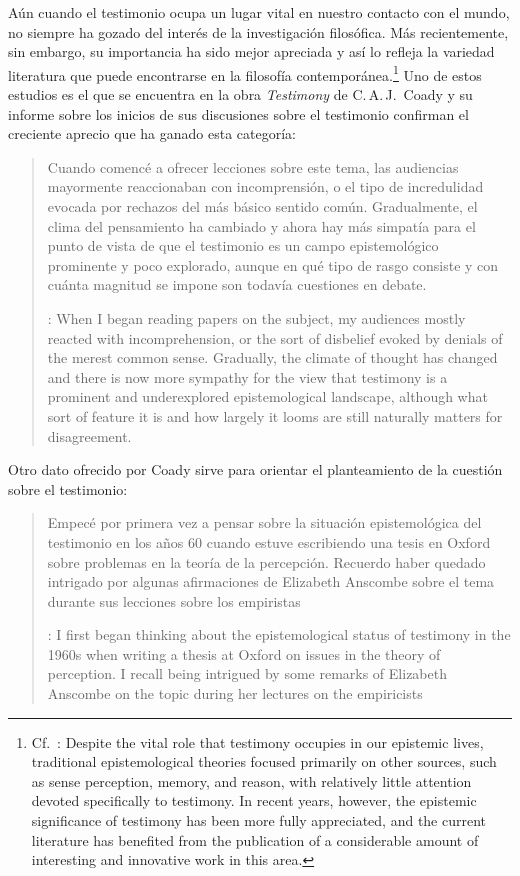 Aún cuando el testimonio ocupa un lugar vital en nuestro contacto con el mundo,
no siempre ha gozado del interés de la investigación filosófica. Más
recientemente, sin embargo, su importancia ha sido mejor apreciada y así lo
refleja la variedad literatura que puede encontrarse en la filosofía
contemporánea.\footnote{Cf.~\cite[1]{lackeysosa2006eptest}: Despite the vital
  role that testimony occupies in our epistemic lives, traditional
  epistemological theories focused primarily on other sources, such as sense
  perception, memory, and reason, with relatively little attention devoted
  specifically to testimony. In recent years, however, the epistemic
  significance of testimony has been more fully appreciated, and the current
  literature has benefited from the publication of a considerable amount of
  interesting and innovative work in this area.} Uno de estos estudios es el que
se encuentra en la obra \emph{Testimony} de C.\,A.\,J.~Coady y su informe sobre
los inicios de sus discusiones sobre el testimonio confirman el creciente
aprecio que ha ganado esta categoría:
\blockquote[{\cite[vii]{coady1992test}}: When I began reading papers on the
subject, my audiences mostly reacted with incomprehension, or the sort of
disbelief evoked by denials of the merest common sense. Gradually, the climate
of thought has changed and there is now more sympathy for the view that
testimony is a prominent and underexplored epistemological landscape, although
what sort of feature it is and how largely it looms are still naturally matters
for disagreement.]{Cuando comencé a ofrecer lecciones sobre este tema, las
  audiencias mayormente reaccionaban con incomprensión, o el tipo de
  incredulidad evocada por rechazos del más básico sentido común. Gradualmente,
  el clima del pensamiento ha cambiado y ahora hay más simpatía para el punto de
  vista de que el testimonio es un campo epistemológico prominente y poco
  explorado, aunque en qué tipo de rasgo consiste y con cuánta magnitud se
  impone son todavía cuestiones en debate.}
Otro dato ofrecido por Coady sirve para orientar el planteamiento de la cuestión
sobre el testimonio:
\blockquote[{\cite[vii]{coady1992test}}: I first began thinking about the
epistemological status of testimony in the 1960s when writing a thesis at Oxford
on issues in the theory of perception. \textelp{} I recall being intrigued by
some remarks of Elizabeth Anscombe on the topic during her lectures on the
empiricists \textelp{}]{Empecé por primera vez a pensar sobre la situación
  epistemológica del testimonio en los años 60 cuando estuve escribiendo una
  tesis en Oxford sobre problemas en la teoría de la percepción. \textelp{}
  Recuerdo haber quedado intrigado por algunas afirmaciones de Elizabeth
  Anscombe sobre el tema durante sus lecciones sobre los empiristas \textelp{}}

